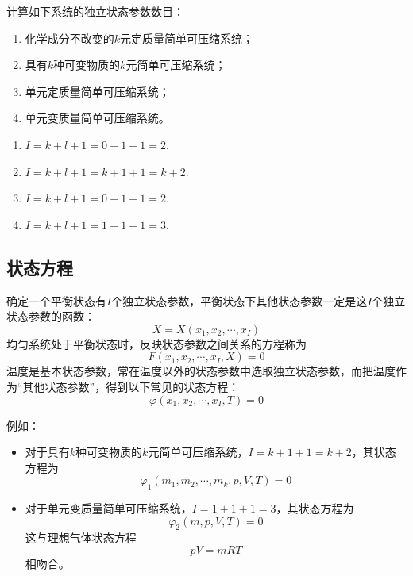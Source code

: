 \examples 计算如下系统的独立状态参数数目：
\begin{enumerate}[\hspace*{2em}(1)]
	\item 化学成分不改变的$k$元定质量简单可压缩系统；
	\item 具有$k$种可变物质的$k$元简单可压缩系统；
	\item 单元定质量简单可压缩系统；
	\item 单元变质量简单可压缩系统。
\end{enumerate}

\solve 
\begin{enumerate}[\hspace*{2em}(1)]
	\item $I=k+l+1=0+1+1=2.$
	\item $I=k+l+1=k+1+1=k+2.$
	\item $I=k+l+1=0+1+1=2.$
	\item $I=k+l+1=1+1+1=3.$
\end{enumerate}

\subsection{状态方程}
\tdefination[状态方程]
确定一个平衡状态有$I$个独立状态参数，平衡状态下其他状态参数一定是这$I$个独立状态参数的函数：
\begin{equation}
	X = X(x_1,x_2,\cdots,x_I)
\end{equation}
均匀系统处于平衡状态时，反映状态参数之间关系的方程称为
\begin{equation}
	F(x_1,x_2,\cdots,x_I,X)=0
\end{equation}
温度是基本状态参数，常在温度以外的状态参数中选取独立状态参数，而把温度作为“其他状态参数”，得到以下常见的状态方程：
\begin{equation}
	\varphi(x_1,x_2,\cdots,x_I,T) = 0
\end{equation}

\noindent 例如：
\begin{itemize}
	\item 对于具有$k$种可变物质的$k$元简单可压缩系统，$I=k+1+1=k+2$，其状态方程为
	\begin{equation}
		\varphi_1 (m_1,m_2,\cdots,m_k,p,V,T) = 0
	\end{equation}
	\item 对于单元变质量简单可压缩系统，$I=1+1+1=3$，其状态方程为
	\begin{equation}
		\varphi_2(m,p,V,T) = 0
	\end{equation}
	这与理想气体状态方程
	\begin{equation}
		pV=mRT
	\end{equation}
相吻合。
\end{itemize}

